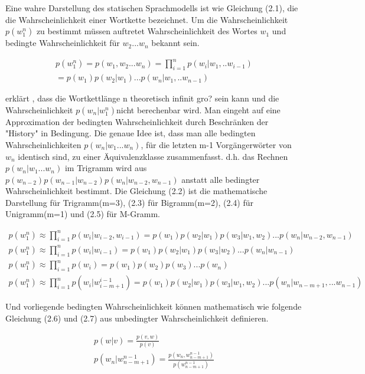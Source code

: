 Eine wahre Darstellung des statischen Sprachmodells ist wie Gleichung (2.1), die die Wahrscheinlichkeit einer Wortkette bezeichnet. Um die Wahrscheinlichkeit $p(w_{1}^n)$ zu bestimmt m\"ussen auftretet Wahrscheinlichkeit des Wortes $w_{1}$ und bedingte Wahrscheinlichkeit f\"ur $w_{2}...w_{n}$ bekannt sein.

\begin{multline}
p(w_{1}^n) = p(w_{1},w_{2}...w_{n}) = \prod_{i=1}^n p(w_{i}|w_{1},..w_{i-1}) \\
= p(w_{1})p(w_{2}|w_{1})...p(w_{n}|w_{1},..w_{n-1})
\end{multline}

\cite{book_speech} erkl\"art , dass die Wortkettl\"ange n theoretisch infinit gro? sein kann und die Wahrscheinlichkeit $p(w_{n}|w_{1}^n)$nicht berechenbar wird. Man eingeht auf eine Approximation der bedingten Wahrscheinlichkeit durch Beschr\"anken der "History" in Bedingung. Die genaue Idee ist, dass man alle bedingten Wahrscheinlichkeiten $p(w_{n}|w_{1}...w_{n})$, f\"ur die letzten m-1 Vorg\"angerw\"orter von $w_{n}$ identisch sind, zu einer \"Aquivalenzklasse zusammenfasst. d.h. das Rechnen $p(w_{n}|w_{1}...w_{n})$ im Trigramm wird aus $p(w_{n-2})p(w_{n-1}|w_{n-2})p(w_{n}|w_{n-2},w_{n-1})$ anstatt alle bedingter Wahrscheinlichkeit bestimmt. 
Die Gleichung (2.2) ist die mathematische Darstellung f\"ur Trigramm(m=3), (2.3) f\"ur Bigramm(m=2), (2.4) f\"ur Unigramm(m=1) und (2.5) f\"ur M-Gramm.

\begin{gather}
p(w_{1}^n) \approx \prod_{i=1}^n p(w_{i}|w_{i-2},w_{i-1})=p(w_{1})p(w_{2}|w_{1})p(w_{3}|w_{1},w_{2})...p(w_{n}|w_{n-2},w_{n-1}) \\
p(w_{1}^n) \approx \prod_{i=1}^n p(w_{i}|w_{i-1})=p(w_{1})p(w_{2}|w_{1})p(w_{3}|w_{2})...p(w_{n}|w_{n-1}) \\
p(w_{1}^n) \approx \prod_{i=1}^n p(w_{i})=p(w_{1})p(w_{2})p(w_{3})...p(w_{n})\\
p(w_{1}^n) \approx \prod_{i=1}^n p(w_{i}|w_{i-m+1}^{i-1})=p(w_{1})p(w_{2}|w_{1})p(w_{3}|w_{1},w_{2})...p(w_{n}|w_{n-m+1},...w_{n-1})
\end{gather}

Und vorliegende bedingten Wahrscheinlichkeit k\"onnen mathematisch wie folgende Gleichung (2.6) und (2.7)  aus unbedingter Wahrscheinlichkeit definieren.

\begin{gather}
p(w|v)=\frac{p(v,w)}{p(v)} \\
p(w_{n}|w_{n-m+1}^{n-1})=\frac{p(w_{n},w_{n-m+1}^{n-1} )}{p(w_{n-m+1}^{n-1})} 
\end{gather}

